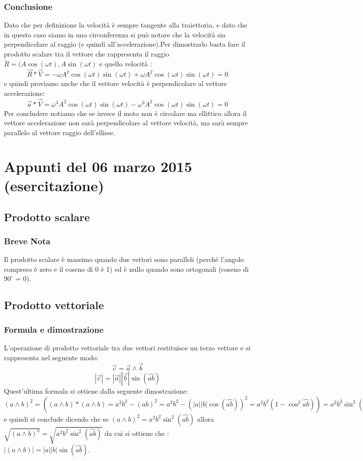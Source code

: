 \documentclass[portait]{article}
\begin{document}
\subsubsection{Conclusione}
Dato che per definizione la velocità è sempre tangente alla traiettoria, e dato che in questo caso siamo in una circonferenza si può notare che la velocità sia perpendicolare al raggio (e quindi all'accelerazione).Per dimostrarlo basta fare il prodotto scalare tra il vettore che rappresenta il raggio $\overleftarrow{R} = (A\cos(\omega t),A\sin(\omega t)$ e quello velocità : 
$$\overrightarrow{R} * \overrightarrow{V} = -\omega A^2 \cos(\omega t) \sin(\omega t) +\omega A^2 \cos(\omega t) \sin(\omega t) = 0 $$
e quindi proviamo anche che il vettore velocità è perpendicolare al vettore accelerazione:
$$\overrightarrow{a} * \overrightarrow{V} = \omega^3A^2\cos(\omega t) \sin(\omega t) -\omega^3A^2\cos(\omega t) \sin(\omega t) = 0$$
Per concludere notiamo che se invece il moto non è circolare ma ellittico allora il vettore accelerazione non sarà perpendicolare al vettore velocità, ma sarà sempre parallelo al vettore raggio dell'ellisse.
\section{Appunti del 06 marzo 2015 (esercitazione)}
\subsection{Prodotto scalare}
\subsubsection{Breve Nota}
Il prodotto scalare è massimo quando due vettori sono paralleli (perché l'angolo compreso è zero e il coseno di 0 è 1) ed è nullo quando sono ortogonali (coseno di $90^\circ$ = 0).
\subsection{Prodotto vettoriale}
\subsubsection{Formula e dimostrazione}
L'operazione di prodotto vettoriale tra due vettori restituisce un terzo vettore e si rappresenta nel seguente modo:
$$\overrightarrow{c} = \overrightarrow{a} \wedge \overrightarrow{b}$$
$$|\overrightarrow{c}|=|\overrightarrow{a}||\overrightarrow{b}|\sin(\widehat{ab})$$
Quest'ultima formula si ottiene dalla seguente dimostrazione:$(a \wedge b)^2 = ((a \wedge b)*(a \wedge b) = a^2b^2 - (ab)^2 = a^2b^2 -(|a||b|\cos(\widehat{ab}))^2 = a^2b^2(1-\cos^2\widehat{ab})) = a^2b^2 \sin^2(\widehat{ab})$ e quindi si conclude dicendo che se $(a \wedge b)^2 = a^2b^2 \sin^2(\widehat{ab}) $ allora $\sqrt{(a \wedge b)^2} = \sqrt{a^2b^2 \sin^2(\widehat{ab})} $ da cui si ottiene che : $|(a \wedge b)| = |a||b|\sin(\widehat{ab})$. 
\end{document}
